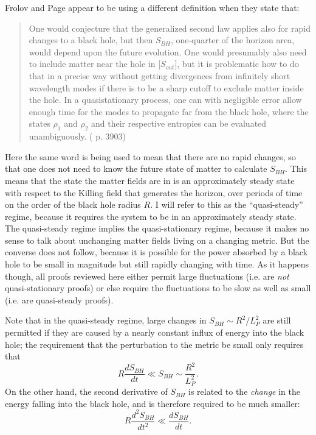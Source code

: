 \documentclass[12pt]{article}
\begin{document}
Frolov and Page appear to be using a different definition when they state that:
\begin{quote}\small
One would conjecture that the generalized second law applies also for rapid changes to a black hole, but then $S_{BH}$, one-quarter of the horizon area, would depend upon the future evolution.  One would presumably also need to include matter near the hole in [$S_{out}$], but it is problematic how to do that in a precise way without getting divergences from infinitely short wavelength modes if there is to be a sharp cutoff to exclude matter inside the hole.  In a quasistationary process, one can with negligible error allow enough time for the modes to propagate far from the black hole, where the states $\rho_1$ and $\rho_2$ and their respective entropies can be evaluated unambiguously. (\cite{FP93} p. 3903)
\end{quote}
Here the same word is being used to mean that there are no rapid changes, so that one does not need to know the future state of matter to calculate $S_{BH}$.  This means that the state the matter fields are in is an approximately steady state with respect to the Killing field that generates the horizon, over periods of time on the order of the black hole radius $R$.  I will refer to this as the ``quasi-steady'' regime, because it requires the system to be in an approximately steady state.  The quasi-steady regime implies the quasi-stationary regime, because it makes no sense to talk about unchanging matter fields living on a changing metric.  But the converse does not follow, because it is possible for the power absorbed by a black hole to be small in magnitude but still rapidly changing with time.  As it happens though, all proofs reviewed here either permit large fluctuations (i.e. are \emph{not} quasi-stationary proofs) or else require the fluctuations to be slow as well as small (i.e. are quasi-steady proofs).

Note that in the quasi-steady regime, large changes in $S_{BH} \sim R^2/L_{P}^2$ are still permitted if they are caused by a nearly constant influx of energy into the black hole; the requirement that the perturbation to the metric be small only requires that
\begin{equation}\label{primus}
R \frac{dS_{BH}}{dt} \ll S_{BH} \sim \frac{R^2}{L_P^2}.
\end{equation}
On the other hand, the second derivative of $S_{BH}$ is related to the \emph{change} in the energy falling into the black hole, and is therefore required to be much smaller:
\begin{equation}\label{secundus}
R \frac{d^2 S_{BH}}{dt^2} \ll \frac{dS_{BH}}{dt}.
\end{equation}
\end{document}
